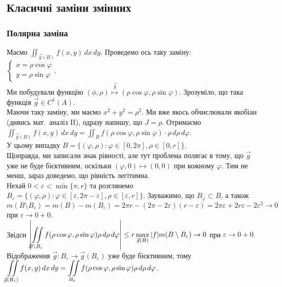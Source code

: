 \documentclass[a4paper, 10pt]{article}
\theoremstyle{theoremdd}
\theoremstyle{theoremdd}
\theoremstyle{theoremdd}
\theoremstyle{theoremdd}
\theoremstyle{theoremdd}
\theoremstyle{theoremdd}
\theoremstyle{theoremdd}
\theoremstyle{theoremdd}
\theoremstyle{theoremdd}
\theoremstyle{theoremdd}
\theoremstyle{theoremdd}
\theoremstyle{theoremdd}
\theoremstyle{theoremdd}
\theoremstyle{theoremdd}
\theoremstyle{theoremdd}
\begin{document}
\subsection{Класичні заміни змінних}
\subsubsection{Полярна заміна}
Маємо $\displaystyle\iint_{\vec{g}(B)} f(x,y)\,dx\,dy$. Проведемо ось таку заміну:\\
$\begin{cases}
x = \rho \cos \varphi \\
y = \rho \sin \varphi
\end{cases}$.\\
Ми побудували функцію $(\phi,\rho) \overset{\vec{g}}{\mapsto} (\rho \cos \varphi, \rho \sin \varphi)$. Зрозуміло, що така функція $\vec{g} \in C^1(A)$.\\
Маючи таку заміну, ми маємо $x^2 + y^2 = \rho^2$. Ми вже якось обчислювали якобіан (дивись мат.\ аналіз II), одразу напишу, що $J = \rho$. Отримаємо\\
$\displaystyle\iint_{\vec{g}(B)} f(x,y)\,dx\,dy = \iint_{B} f(\rho \cos \varphi, \rho \sin \varphi) \cdot \rho\,d\rho\,d\varphi$.\\
У цьому випадку $B = \{ (\varphi,\rho) : \varphi \in [0,2\pi], \rho \in [0,r] \}$. \\
Щоправда, ми записали знак рівності, але тут проблема полягає в тому, що $\vec{g}$ уже не буде бієктивним, оскільки $(\varphi,0) \mapsto (0,0)$ при кожному $\varphi$. Тим не менш, зараз доведемо, що рівність легітимна.
\bigskip \\
Нехай $0 < \varepsilon < \min\{\pi,r\}$ та розглянемо $B_\varepsilon = \{ (\varphi,\rho) : \varphi \in [\varepsilon,2\pi - \varepsilon], \rho \in [\varepsilon,r]\}$. Зауважимо, що $B_\varphi \subset B$, а також \\
$m(B \setminus B_\varepsilon) = m(B) - m(B_\varepsilon) = 2\pi r - (2\pi - 2\varepsilon) (r - \varepsilon) = 2\pi \varepsilon + 2r\varepsilon - 2\varepsilon^2 \to 0$ при $\varepsilon \to 0+0$.\\
Звідси $\displaystyle\left| \iint\displaylimits_{B \setminus B_\varepsilon} f(\rho \cos \varphi, \rho \sin \varphi) \rho\,d\rho\,d\varphi \right| \leq r \max_{\vec{g}(B)} |f| m(B \setminus B_\varepsilon) \to 0$ при $\varepsilon  \to 0+0$.\\
Відображення $\vec{g} \colon B_\varepsilon \to \vec{g}(B_\varepsilon)$ уже буде бієктивним, тому $\displaystyle\iint\displaylimits_{\vec{g}(B_\varepsilon)} f(x,y)\,dx\,dy = \iint\displaylimits_{B_\varepsilon} f(\rho \cos \varphi, \rho \sin \varphi) \rho\,d\rho\,d\varphi$.\\
\end{document}

